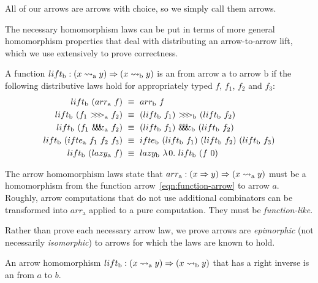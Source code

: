 \documentclass{llncs}
\newcommand{\arrow}{\rightsquigarrow}
\newcommand{\arrowlift}{\ensuremath{lift}}
\newcommand{\arrowarr}{\ensuremath{arr}}
\newcommand{\arrowcomp}{\ensuremath{{>}\mspace{-6mu}{>}\mspace{-6mu}{>}}}
\newcommand{\arrowpair}{\ensuremath{\mathit{\&\mspace{-7.5mu}\&\mspace{-7.5mu}\&}}}
\newcommand{\arrowif}{\ensuremath{ifte}}
\newcommand{\arrowlazy}{\ensuremath{lazy}}
\newcommand{\gen}{_\mathrm{a}}
\newcommand{\genb}{_\mathrm{b}}
\begin{document}
All of our arrows are arrows with choice, so we simply call them arrows.

The necessary homomorphism laws can be put in terms of more general homomorphism properties that deal with distributing an arrow-to-arrow lift, which we use extensively to prove correctness.

\begin{definition}
\label{def:arrow-homomorphism}
A function $lift\genb : (x \arrow\gen y) \tto (x \arrow\genb y)$ is an  from arrow $\mathrm{a}$ to arrow $\mathrm{b}$ if the following distributive laws hold for appropriately typed $f$, $f_1$, $f_2$ and $f_3$:
\begin{align}
	lift\genb~(\arrowarr\gen~f) &\ \equiv \ \arrowarr\genb~f
	\label{eqn:lift-distributes-over-arr}
\\
	lift\genb~(f_1~\arrowcomp\gen~f_2) &\ \equiv \ (lift\genb~f_1)~\arrowcomp\genb~(lift\genb~f_2)
	\label{eqn:lift-distributes-over-comp}
\\
	lift\genb~(f_1~\arrowpair\gen~f_2) &\ \equiv \ (lift\genb~f_1)~\arrowpair\genb~(lift\genb~f_2)
	\label{eqn:lift-distributes-over-pair}
\\
	\arrowlift\genb~(\arrowif\gen~f_1~f_2~f_3) &\ \equiv \ 
		\arrowif\genb~(lift\genb~f_1)~(lift\genb~f_2)~(lift\genb~f_3)
	\label{eqn:lift-distributes-over-if}
\\
	\arrowlift\genb~(\arrowlazy\gen~f) &\ \equiv \
		\arrowlazy\genb~\fun{0}{\arrowlift\genb~(f~0)}
	\label{eqn:lift-distributes-over-lazy}
\end{align}
\end{definition}

The arrow homomorphism laws state that $\arrowarr\gen : (x \tto y) \tto (x \arrow\gen y)$ must be a homomorphism from the function arrow~\eqref{eqn:function-arrow} to arrow $a$.
Roughly, arrow computations that do not use additional combinators can be transformed into $\arrowarr\gen$ applied to a pure computation.
They must be \emph{function-like}.

Rather than prove each necessary arrow law, we prove arrows are \emph{epimorphic} (not necessarily \emph{isomorphic}) to arrows for which the laws are known to hold.

\begin{definition}
\label{def:arrow-epimorphism}
An arrow homomorphism $\arrowlift\genb : (x \arrow\gen y) \tto (x \arrow\genb y)$ that has a right inverse is an  from $a$ to $b$.
\end{definition}
\end{document}

